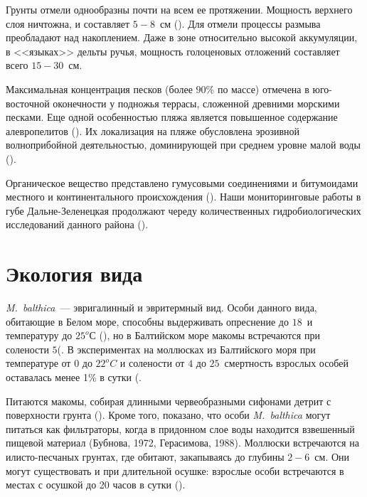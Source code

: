 Грунты отмели однообразны почти на всем ее протяжении. 
Мощность верхнего слоя ничтожна, и составляет $5 - 8$~см (\cite{Prigorovskiy_1948}). 
Для отмели процессы размыва преобладают над накоплением. 
Даже в зоне относительно высокой аккумуляции, в <<языках>> дельты ручья, мощность голоценовых отложений составляет всего $15 - 30$~см.

Максимальная концентрация песков (более $90$\% по массе) отмечена в юго-восточной оконечности у подножья террасы, сложенной древними морскими песками. Еще одной особенностью пляжа является повышенное содержание алевропелитов (\cite{Pavlova_1976}). 
Их локализация на пляже обусловлена эрозивной волноприбойной деятельностью, доминирующей при среднем уровне малой воды (\cite{Alexeev_1976}).

Органическое вещество представлено гумусовыми соединениями и битумоидами местного и континентального происхождения (\cite{Gurevich_Yakovleva_1976}).
Наши мониторинговые работы в губе Дальне-Зеленецкая продолжают череду количественных гидробиологических исследований данного района (\cite{Prigorovskiy_1948, Matveeva_et_al_1955, Streltsov_et_al_1974, Agarova_et_al_1976, Zhukov_1984, Strelkov_et_al_2001}).


		\section{Экология вида}
\textit{M.~balthica}~--- эвригалинный и эвритермный вид. 
Особи данного вида, обитающие в Белом море, способны выдерживать опреснение до $18$\permil\ и температуру до $25^oС$ (\cite{Naumov_2006}), но в Балтийском море макомы встречаются при солености $5$\permil (\cite{Karpevich_Shurin_1970}.
В экспериментах на моллюсках из Балтийского моря при температуре от $0$ до $22^oC$ и солености от $4$ до $25$\permil\ смертность взрослых особей оставалась менее 1\% в сутки (\cite{Karpevich_1968}.

Питаются макомы, собирая длинными червеобразными сифонами детрит с поверхности грунта (\cite{Naumov_2006}). 
Кроме того, показано, что особи \textit{M.~balthica} могут питаться как фильтраторы, когда в придонном слое воды находится взвешенный пищевой материал (Бубнова, 1972, Герасимова, 1988). 
Моллюски встречаются на илисто-песчаных грунтах, где обитают, закапываясь до глубины $2-6$~см. 
Они могут существовать и при длительной осушке: взрослые особи встречаются в местах с осушкой до 20 часов в сутки (\cite{Sveshnikov_1963}). 


